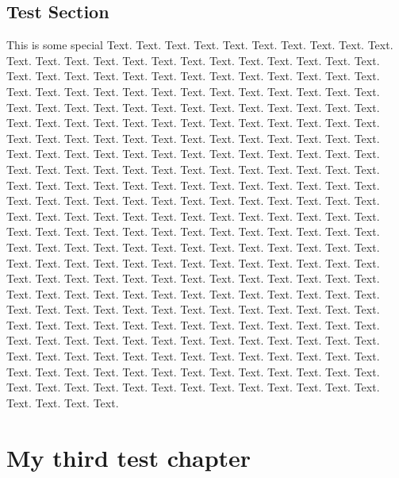 \documentclass{book}
\begin{document}
\section{Test Section}
This is some special Text. Text. Text. Text. Text. Text. Text. Text. Text. Text. Text. Text. Text. Text. Text. Text. Text. Text. Text. Text. Text. Text. Text. Text. Text. Text. Text. Text. Text. Text. Text. Text. Text. Text. Text. Text. Text. Text. Text. Text. Text. Text. Text. Text. Text. Text. Text. Text. Text. Text. Text. Text. Text. Text. Text. Text. Text. Text. Text. Text. Text. Text. Text. Text. Text. Text. Text. Text. Text. Text. Text. Text. Text. Text. Text. Text. Text. Text. Text. Text. Text. Text. Text. Text. Text. Text. Text. Text. Text. Text. Text. Text. Text. Text. Text. Text. Text. Text. Text. Text. Text. Text. Text. Text. Text. Text. Text. Text. Text. Text. Text. Text. Text. Text. Text. Text. Text. Text. Text. Text. Text. Text. Text. Text. Text. Text. Text. Text. Text. Text. Text. Text. Text. Text. Text. Text. Text. Text. Text. Text. Text. Text. Text. Text. Text. Text. Text. Text. Text. Text. Text. Text. Text. Text. Text. Text. Text. Text. Text. Text. Text. Text. Text. Text. Text. Text. Text. Text. Text. Text. Text. Text. Text. Text. Text. Text. Text. Text. Text. Text. Text. Text. Text. Text. Text. Text. Text. Text. Text. Text. Text. Text. Text. Text. Text. Text. Text. Text. Text. Text. Text. Text. Text. Text. Text. Text. Text. Text. Text. Text. Text. Text. Text. Text. Text. Text. Text. Text. Text. Text. Text. Text. Text. Text. Text. Text. Text. Text. Text. Text. Text. Text. Text. Text. Text. Text. Text. Text. Text. Text. Text. Text. Text. Text. Text. Text. Text. Text. Text. Text. Text. Text. Text. Text. Text. Text. Text. Text. Text. Text. Text. Text. Text. Text. Text. Text. Text. Text. Text. Text. Text. Text. Text. Text. Text. Text. Text. Text. Text. Text. Text. Text. Text. Text. Text. Text. Text. Text. Text. Text. Text. Text. Text. Text. Text. Text. Text. Text. Text. Text.

\chapter{My third test chapter}
\end{document}
